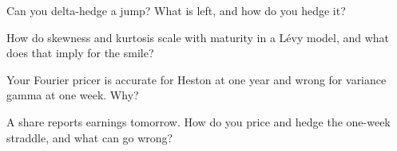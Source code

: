 \begin{interviewq}\label{iq:dv:jumps-and-levy-models:3}
Can you delta-hedge a jump? What is left, and how do you hedge it?
\end{interviewq}

\begin{interviewq}\label{iq:dv:jumps-and-levy-models:4}
How do skewness and kurtosis scale with maturity in a Lévy model, and what does that imply for the smile?
\end{interviewq}

\begin{interviewq}\label{iq:dv:jumps-and-levy-models:5}
Your Fourier pricer is accurate for Heston at one year and wrong for variance gamma at one week. Why?
\end{interviewq}

\begin{interviewq}\label{iq:dv:jumps-and-levy-models:6}
A share reports earnings tomorrow. How do you price and hedge the one-week straddle, and what can go wrong?
\end{interviewq}
